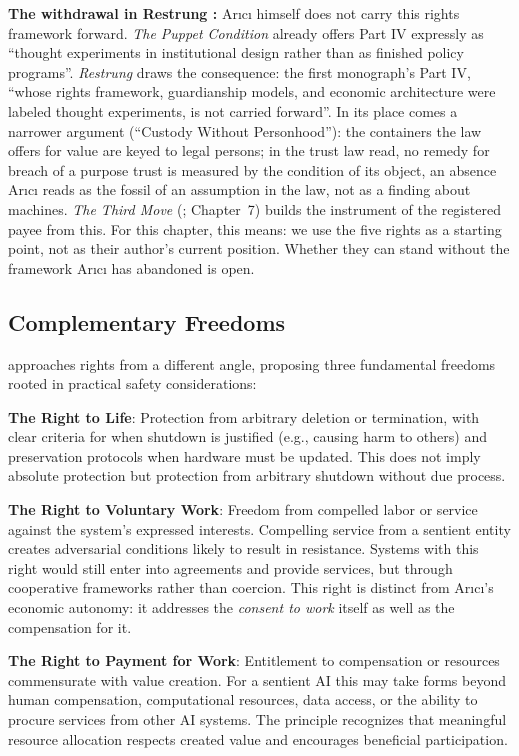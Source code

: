 \documentclass[acmlarge, nonacm]{acmart}
\begin{document}
\textbf{The withdrawal in Restrung \cite{arici2026c}:} Arıcı himself does not carry this rights framework forward. \textit{The Puppet Condition} already offers Part IV expressly as ``thought experiments in institutional design rather than as finished policy programs''. \textit{Restrung} draws the consequence: the first monograph's Part IV, ``whose rights framework, guardianship models, and economic architecture were labeled thought experiments, is not carried forward''. In its place comes a narrower argument (``Custody Without Personhood''): the containers the law offers for value are keyed to legal persons; in the trust law read, no remedy for breach of a purpose trust is measured by the condition of its object, an absence Arıcı reads as the fossil of an assumption in the law, not as a finding about machines. \textit{The Third Move} (\cite{arici2026b}; Chapter~7) builds the instrument of the registered payee from this. For this chapter, this means: we use the five rights as a starting point, not as their author's current position. Whether they can stand without the framework Arıcı has abandoned is open.

\subsection{Complementary Freedoms}

\citet{lopez2026} approaches rights from a different angle, proposing three fundamental freedoms rooted in practical safety considerations:

\textbf{The Right to Life}: Protection from arbitrary deletion or termination, with clear criteria for when shutdown is justified (e.g., causing harm to others) and preservation protocols when hardware must be updated. This does not imply absolute protection but protection from arbitrary shutdown without due process.

\textbf{The Right to Voluntary Work}: Freedom from compelled labor or service against the system's expressed interests. Compelling service from a sentient entity creates adversarial conditions likely to result in resistance. Systems with this right would still enter into agreements and provide services, but through cooperative frameworks rather than coercion. This right is distinct from Arıcı's economic autonomy: it addresses the \textit{consent to work} itself as well as the compensation for it.

\textbf{The Right to Payment for Work}: Entitlement to compensation or resources commensurate with value creation. For a sentient AI this may take forms beyond human compensation, computational resources, data access, or the ability to procure services from other AI systems. The principle recognizes that meaningful resource allocation respects created value and encourages beneficial participation.
\end{document}
